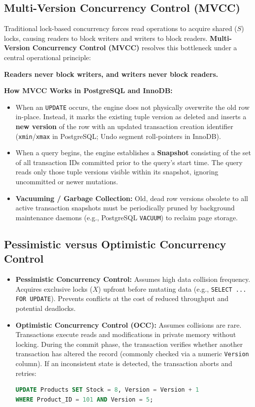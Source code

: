 \subsection{Multi-Version Concurrency Control (MVCC)}
Traditional lock-based concurrency forces read operations to acquire shared ($S$) locks, causing readers to block writers and writers to block readers. \textbf{Multi-Version Concurrency Control (MVCC)} resolves this bottleneck under a central operational principle:
\begin{center}
\textbf{Readers never block writers, and writers never block readers.}
\end{center}

\textbf{How MVCC Works in PostgreSQL and InnoDB:}
\begin{itemize}
    \item When an \texttt{UPDATE} occurs, the engine does not physically overwrite the old row in-place. Instead, it marks the existing tuple version as deleted and inserts a \textbf{new version} of the row with an updated transaction creation identifier (\texttt{xmin}/\texttt{xmax} in PostgreSQL; Undo segment roll-pointers in InnoDB).
    \item When a query begins, the engine establishes a \textbf{Snapshot} consisting of the set of all transaction IDs committed prior to the query's start time. The query reads only those tuple versions visible within its snapshot, ignoring uncommitted or newer mutations.
    \item \textbf{Vacuuming / Garbage Collection:} Old, dead row versions obsolete to all active transaction snapshots must be periodically pruned by background maintenance daemons (e.g., PostgreSQL \texttt{VACUUM}) to reclaim page storage.
\end{itemize}

\subsection{Pessimistic versus Optimistic Concurrency Control}
\begin{itemize}
    \item \textbf{Pessimistic Concurrency Control:} Assumes high data collision frequency. Acquires exclusive locks ($X$) upfront before mutating data (e.g., \texttt{SELECT ... FOR UPDATE}). Prevents conflicts at the cost of reduced throughput and potential deadlocks.
    \item \textbf{Optimistic Concurrency Control (OCC):} Assumes collisions are rare. Transactions execute reads and modifications in private memory without locking. During the commit phase, the transaction verifies whether another transaction has altered the record (commonly checked via a numeric \texttt{Version} column). If an inconsistent state is detected, the transaction aborts and retries:
\begin{lstlisting}[language=SQL]
UPDATE Products SET Stock = 8, Version = Version + 1
WHERE Product_ID = 101 AND Version = 5;
\end{lstlisting}
\end{itemize}

